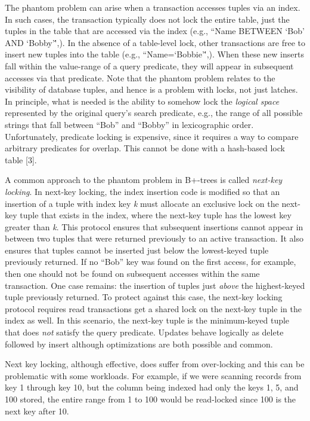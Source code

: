 \documentclass[a4paper,11pt,twoside,openright]{book}
\begin{document}
The phantom problem can arise when a transaction accesses tuples via an
index. In such cases, the transaction typically does not lock the entire
table, just the tuples in the table that are accessed via the index
(e.g., ``Name BETWEEN `Bob' AND `Bobby'\'',). In the absence of a
table-level lock, other transactions are free to insert new tuples into
the table (e.g., ``Name=`Bobbie'\'',). When these new inserts fall
within the value-range of a query predicate, they will appear in
subsequent accesses via that predicate. Note that the phantom problem
relates to the visibility of database tuples, and hence is a problem
with locks, not just latches. In principle, what is needed is the
ability to somehow lock the \emph{logical space} represented by the
original query's search predicate, e.g., the range of all possible
strings that fall between ``Bob'' and ``Bobby'' in lexicographic order.
Unfortunately, predicate locking is expensive, since it requires a way
to compare arbitrary predicates for overlap. This cannot be done with a
hash-based lock table {[}3{]}.

A common approach to the phantom problem in B+-trees is called
\emph{next-key locking}. In next-key locking, the index insertion code
is modified so that an insertion of a tuple with index key \emph{k} must
allocate an
exclusive lock on the next-key tuple that exists in the index, where the
next-key tuple has the lowest key greater than \emph{k}. This protocol
ensures that subsequent insertions cannot appear in between two tuples
that were returned previously to an active transaction. It also ensures
that tuples cannot be inserted just below the lowest-keyed tuple
previously returned. If no ``Bob'' key was found on the first access,
for example, then one should not be found on subsequent accesses within
the same transaction. One case remains: the insertion of tuples just
\emph{above} the highest-keyed tuple previously returned. To protect
against this case, the next-key locking protocol requires read
transactions get a shared lock on the next-key tuple in the index as
well. In this scenario, the next-key tuple is the minimum-keyed tuple
that does \emph{not} satisfy the query predicate. Updates behave
logically as delete followed by insert although optimizations are both
possible and common.

Next key locking, although effective, does suffer from over-locking and
this can be problematic with some workloads. For example, if we were
scanning records from key 1 through key 10, but the column being indexed
had only the keys 1, 5, and 100 stored, the entire range from 1 to 100
would be read-locked since 100 is the next key after 10.
\end{document}
